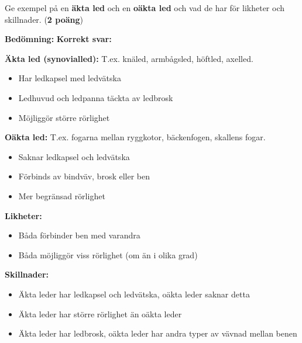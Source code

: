 \documentclass{exam}
\newenvironment{answer}
  {\begin{framed}\color{blue}\textbf{Bedömning:} }
  {\end{framed}}
\begin{document}
\begin{questions}
\question Ge exempel på en \textbf{äkta led} och en \textbf{oäkta led} och vad de har för likheter och skillnader. (\textbf{2 poäng})
\vspace{10mm}

\begin{answer}
\textbf{Korrekt svar:}

\textbf{Äkta led (synovialled):} T.ex. knäled, armbågsled, höftled, axelled.
\begin{itemize}
  \item Har ledkapsel med ledvätska
  \item Ledhuvud och ledpanna täckta av ledbrosk
  \item Möjliggör större rörlighet
\end{itemize}

\textbf{Oäkta led:} T.ex. fogarna mellan ryggkotor, bäckenfogen, skallens fogar.
\begin{itemize}
  \item Saknar ledkapsel och ledvätska
  \item Förbinds av bindväv, brosk eller ben
  \item Mer begränsad rörlighet
\end{itemize}

\textbf{Likheter:}
\begin{itemize}
  \item Båda förbinder ben med varandra
  \item Båda möjliggör viss rörlighet (om än i olika grad)
\end{itemize}

\textbf{Skillnader:}
\begin{itemize}
  \item Äkta leder har ledkapsel och ledvätska, oäkta leder saknar detta
  \item Äkta leder har större rörlighet än oäkta leder
  \item Äkta leder har ledbrosk, oäkta leder har andra typer av vävnad mellan benen
\end{itemize}


\end{answer}
\end{questions}
\end{document}
